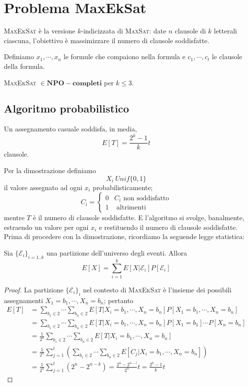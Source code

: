 \section{Problema MaxEkSat}
\textsc{MaxEkSat} è la versione $k$-indicizzata di \textsc{MaxSat}: date $n$ clausole
di $k$ letterali ciascuna, l'obiettivo è massimizzare il numero di clausole
soddisfatte.

Definiamo $x_1, \cdots, x_n$ le formule che compaiono nella formula
e $c_1, \cdots, c_t$ le clausole della formula.

\begin{theorem}\label{thm:maxeksatnp}
	\textsc{MaxEkSat} $\in \mathbf{NPO-completi}$ per $k \leq 3$.
\end{theorem}

\subsection{Algoritmo probabilistico}
\begin{theorem}\label{thm:probassgn}
	Un assegnamento casuale soddisfa, in media,
	$$
		E[T] = \frac{2^k-1}{k} t
	$$
	clausole.
\end{theorem}

Per la dimostrazione definiamo
$$
	X_i ~ Unif\{0,1\}
$$
il valore assegnato ad ogni $x_i$ probabilisticamente;
$$
	C_i =
	\begin{cases}
		0 & C_i \text{ non soddisfatto} \\
		1 & \text{ altrimenti}
	\end{cases}
$$
mentre $T$ è il numero di clausole soddisfatte.
E l'algoritmo si svolge, banalmente, estraendo un valore per ogni $x_i$ e restituendo il numero
di clausole soddisfatte.
Prima di procedere con la dimostrazione, ricordiamo
la seguende legge statistica:
\begin{theorem}\label{thm:leggevat}
	Sia $\{\mathcal{E}_i\}_{i=1..k}$ una partizione dell'universo degli eventi.
	Allora
	$$
		E[X] = \sum_{i = 1}^{k} E[X|\mathcal{E}_i]P[\mathcal{E}_i]
	$$
\end{theorem}

\begin{proof}
	La partizione $\{\mathcal{E}_i\}_i$ nel contesto di \textsc{MaxEkSat} è l'insieme
	dei possibili assegnamenti $X_1 = b_1, \cdots, X_n = b_n$; pertanto
	\begin{align*}
		E[T] & = \sum_{b_1 \in 2} \cdots \sum_{b_n\in 2} E[T|X_i = b_1, \cdots, X_n = b_n]P[X_1 = b_1, \cdots, X_n = b_n]   \\
		     & = \sum_{b_1 \in 2} \cdots \sum_{b_n\in 2} E[T|X_i = b_1, \cdots, X_n = b_n]P[X_1 = b_1] \cdots P[X_n = b_n]  \\
		     & = \frac{1}{2^n}\sum_{b_1 \in 2} \cdots \sum_{b_n\in 2} E[T|X_i = b_1, \cdots, X_n = b_n]                     \\
		     & = \frac{1}{2^n}\sum_{j = 1}^{t}(\sum_{b_1 \in 2} \cdots \sum_{b_n\in 2} E[C_j|X_i = b_1, \cdots, X_n = b_n]) \\
		     & = \frac{1}{2^n} \sum_{j = 1}^t (2^n - 2^{n -k}) = \frac{2^n - 2^{n-l}}{2^n}t =
		\frac{2^k - 1}{k}t
	\end{align*}
\end{proof}

